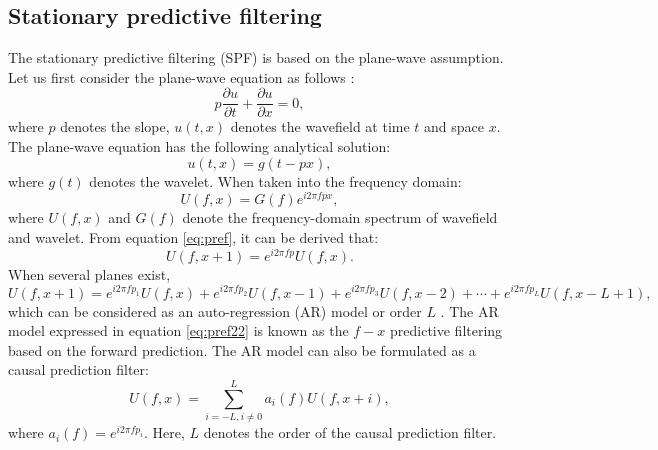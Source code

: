\subsection{Stationary predictive filtering}
The stationary predictive filtering (SPF) is based on the plane-wave assumption. Let us first consider the plane-wave equation as follows \cite[]{fomel2002pwd}:
\begin{equation}
\label{eq:plane}
p \frac{\partial u}{\partial t} + \frac{\partial u}{\partial x} = 0,
\end{equation}
where $p$ denotes the slope, $u(t,x)$ denotes the wavefield at time $t$ and space $x$. The plane-wave equation has the following analytical solution:
\begin{equation}
\label{eq:pre}
u(t,x)=g(t-px),
\end{equation}
where $g(t)$ denotes the wavelet.  When taken into the frequency domain:
\begin{equation}
\label{eq:pref}
U(f,x)=G(f)e^{i2\pi fpx},
\end{equation}
where $U(f,x)$ and $G(f)$ denote the frequency-domain spectrum of wavefield and wavelet. From equation \ref{eq:pref}, it can be derived that:
\begin{equation}
\label{eq:pref2}
U(f,x+1)=e^{i2\pi fp}U(f,x).
\end{equation}
When several planes exist, 
\begin{equation}
\label{eq:pref22}
U(f,x+1)=e^{i2\pi fp_1}U(f,x)+e^{i2\pi fp_2}U(f,x-1)+e^{i2\pi fp_3}U(f,x-2)+\cdots+e^{i2\pi fp_{L}}U(f,x-L+1),
\end{equation}
which can be considered as an auto-regression (AR) model or order $L$ \cite[]{tufts1980,canales1984,yangkang20141}. The AR model expressed in equation \ref{eq:pref22} is known as the $f-x$ predictive filtering based on the forward prediction. The AR model can also be formulated as a causal prediction filter:
\begin{equation}
\label{eq:pref22causal}
U(f,x)=\sum_{i=-L,i\ne 0}^{L}a_i(f)U(f,x+i),
\end{equation}
where $a_i(f)=e^{i2\pi fp_i}$. Here, $L$ denotes the order of the causal prediction filter. 

